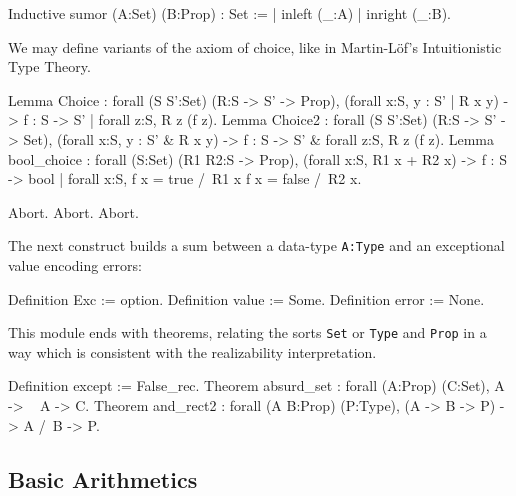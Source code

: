 \begin{coq_example*}
Inductive sumor (A:Set) (B:Prop) : Set :=
| inleft (_:A)
| inright (_:B).
\end{coq_example*}

We may define variants of the axiom of choice, like in Martin-Löf's
Intuitionistic Type Theory.

\begin{coq_example*}
Lemma Choice :
 forall (S S':Set) (R:S -> S' -> Prop),
   (forall x:S, {y : S' | R x y}) ->
   {f : S -> S' | forall z:S, R z (f z)}.
Lemma Choice2 :
 forall (S S':Set) (R:S -> S' -> Set),
   (forall x:S, {y : S' &  R x y}) ->
   {f : S -> S' &  forall z:S, R z (f z)}.
Lemma bool_choice :
 forall (S:Set) (R1 R2:S -> Prop),
   (forall x:S, {R1 x} + {R2 x}) ->
   {f : S -> bool |
   forall x:S, f x = true /\ R1 x \/ f x = false /\ R2 x}.
\end{coq_example*}
\begin{coq_eval}
Abort.
Abort.
Abort.
\end{coq_eval}

The next construct builds a sum between a data-type \verb|A:Type| and
an exceptional value encoding errors:


\begin{coq_example*}
Definition Exc := option.
Definition value := Some.
Definition error := None.
\end{coq_example*}


This module ends with theorems, 
relating the sorts \verb:Set: or \verb:Type: and
\verb:Prop: in a way which is consistent with the realizability
interpretation.

\begin{coq_example*}
Definition except := False_rec.
Theorem absurd_set : forall (A:Prop) (C:Set), A -> ~ A -> C.
Theorem and_rect2 :
 forall (A B:Prop) (P:Type), (A -> B -> P) -> A /\ B -> P.
\end{coq_example*}

\subsection{Basic Arithmetics}

